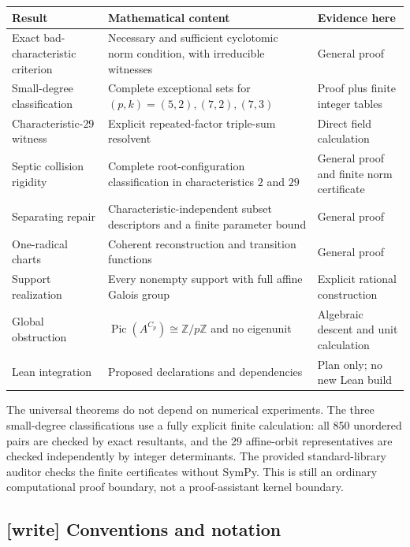 \documentclass[11pt,a4paper]{article}
\theoremstyle{definition}
\theoremstyle{remark}
\newcommand{\Z}{\mathbb Z}
\newcommand{\Pic}{\operatorname{Pic}}
\begin{document}
\begin{center}
\small
\begin{tabularx}{\textwidth}{@{}L{0.26\textwidth}XL{0.22\textwidth}@{}}
\toprule
Result & Mathematical content & Evidence here \\
\midrule
Exact bad-characteristic criterion & Necessary and sufficient cyclotomic norm
condition, with irreducible witnesses & General proof \\
Small-degree classification & Complete exceptional sets for $(p,k)=(5,2),(7,2),(7,3)$
& Proof plus finite integer tables \\
Characteristic-$29$ witness & Explicit repeated-factor triple-sum resolvent
& Direct field calculation \\
Septic collision rigidity & Complete root-configuration classification in
characteristics $2$ and $29$ & General proof and finite norm certificate \\
Separating repair & Characteristic-independent subset descriptors and a
finite parameter bound & General proof \\
One-radical charts & Coherent reconstruction and transition functions
& General proof \\
Support realization & Every nonempty support with full affine Galois group
& Explicit rational construction \\
Global obstruction & $\Pic(A^{C_p})\cong\Z/p\Z$ and no eigenunit
& Algebraic descent and unit calculation \\
Lean integration & Proposed declarations and dependencies
& Plan only; no new Lean build \\
\bottomrule
\end{tabularx}
\end{center}

The universal theorems do not depend on numerical experiments. The three
small-degree classifications use a fully explicit finite calculation: all
850 unordered pairs are checked by exact resultants, and the 29 affine-orbit
representatives are checked independently by integer determinants. The
provided standard-library auditor checks the finite certificates without
SymPy. This is still an ordinary computational proof boundary, not a
proof-assistant kernel boundary.

\subsection{[write] Conventions and notation}
\label{rss:sec:notation}
\end{document}
